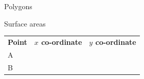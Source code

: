\begin{exercises}{Polygons}
\begin{exercises}{Surface areas }
\begin{figure}[H]
\begin{center}
      \vspace{2pt}
    \vspace{.1in}
    
    \end{center}

 \end{figure}   

    \addtocounter{footnote}{-0}
    
        \par 
        
    
          \begin{table}[H]
        
    
        \begin{center}
      
      \label{m39358*id70156}
      
    \noindent
      \tablelasttail{}
      \begin{xtabular}[t]{|l|l|l|}\hline
    
    
        
                  \textbf{Point}
                 &
    
    
        
                  \textbf{$x$ co-ordinate}
                 &
    
    
        
                  \textbf{$y$ co-ordinate}
     \tabularnewline{}
    
    
        A &
    
    
         &
    
    
     \tabularnewline{}
    
    
        B &
    
    
         &
    
    
     \tabularnewline{}
    

\end{xtabular}
\end{center}
\end{table}
\end{exercises}
\end{exercises}
